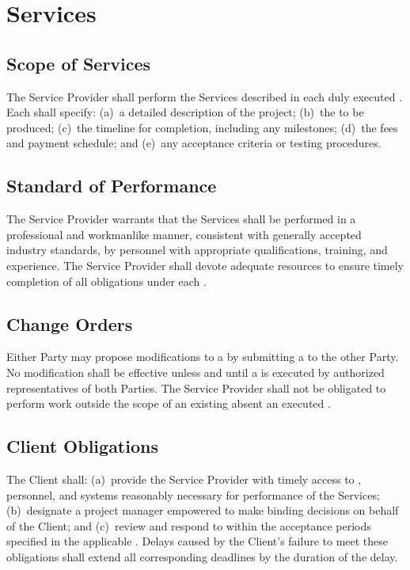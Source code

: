 \section{Services}

\subsection{Scope of Services}
The Service Provider shall perform the Services described in each duly executed . Each  shall specify: (a)~a detailed description of the project; (b)~the  to be produced; (c)~the timeline for completion, including any milestones; (d)~the fees and payment schedule; and (e)~any acceptance criteria or testing procedures.

\subsection{Standard of Performance}
The Service Provider warrants that the Services shall be performed in a professional and workmanlike manner, consistent with generally accepted industry standards, by personnel with appropriate qualifications, training, and experience. The Service Provider shall devote adequate resources to ensure timely completion of all obligations under each .

\subsection{Change Orders}
Either Party may propose modifications to a  by submitting a  to the other Party. No modification shall be effective unless and until a  is executed by authorized representatives of both Parties. The Service Provider shall not be obligated to perform work outside the scope of an existing  absent an executed .

\subsection{Client Obligations}
The Client shall: (a)~provide the Service Provider with timely access to , personnel, and systems reasonably necessary for performance of the Services; (b)~designate a project manager empowered to make binding decisions on behalf of the Client; and (c)~review and respond to  within the acceptance periods specified in the applicable . Delays caused by the Client's failure to meet these obligations shall extend all corresponding deadlines by the duration of the delay.

